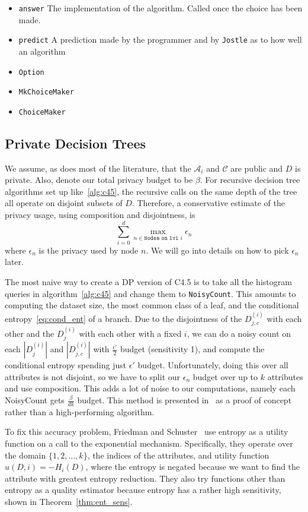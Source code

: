 \documentclass[11pt]{report}
\newcommand{\Jostle}{\texttt{Jostle}}
\renewcommand{\t}[1]{\texttt{#1}}
\begin{document}
\begin{itemize}
\item{\t{answer}} The implementation of the algorithm. Called once the choice has been made.
\item{\t{predict}} A prediction made by the programmer and by \Jostle{} as to how well an algorithm 
\item{\t{Option}}
\item{\t{MkChoiceMaker}}
\item{\t{ChoiceMaker}}
\end{itemize}

\subsection{Private Decision Trees}
We assume, as does most of the literature, that the $\mathcal{A}_i$ and $\mathcal{C}$ are public and $D$ is private. Also, denote our total privacy budget to be $\beta$.
For recursive decision tree algorithms set up like~\ref{alg:c45}, the recursive calls on the same depth of the tree all operate on disjoint subsets of $D$. Therefore, a conservative estimate of the privacy usage, using composition and disjointness, is
\begin{equation}\label{eq:priv_est}
\sum_{i=0}^d \max_{n \in \t{Nodes on lvl }i} \epsilon_{n}
\end{equation}
where $\epsilon_n$ is the privacy used by node $n$. We will go into details on how to pick $\epsilon_n$ later.

The most naive way to create a DP version of C4.5 is to take all the histogram queries in algorithm~\ref{alg:c45} and change them to \t{NoisyCount}. This amounts to computing the dataset size, the most common class of a leaf, and the conditional entropy~\ref{eq:cond_ent} of a branch. Due to the disjointness of the $D^{(i)}_{j,c}$ with each other and the $D^{(i)}_j$ with each other with a fixed $i$, we can do a noisy count on each $|D^{(i)}_j|$ and $|D^{(i)}_{j,c}|$ with $\frac{\epsilon'}{2}$ budget (sensitivity 1), and compute the conditional entropy spending just $\epsilon'$ budget. Unfortunately, doing this over all attributes is not disjoint, so we have to split our $\epsilon_n$ budget over up to $k$ attributes and use composition. This adds a lot of noise to our computations, namely each NoisyCount gets $\frac{\beta}{dk}$ budget. This method is presented in~\cite{Blum:2005} as a proof of concept rather than a high-performing algorithm.

To fix this accuracy problem, Friedman and Schuster~\cite{Friedman:2010} use entropy as a utility function on a call to the exponential mechanism. Specifically, they operate over the domain $\{1,2,\ldots, k\}$, the indices of the attributes, and utility function $u(D, i) = -H_i(D)$, where the entropy is negated because we want to find the attribute with greatest entropy reduction. They also try functions other than entropy as a quality estimator because entropy has a rather high sensitivity, shown in Theorem~\ref{thm:ent_sens}.
\end{document}
